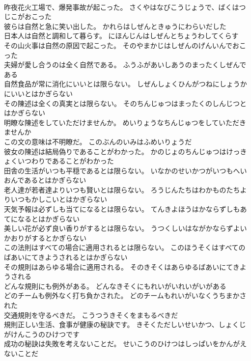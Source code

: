 \documentclass[8pt]{extreport}
\begin{document}
\begin{CJK}{UTF8}{min}
\\	昨夜花火工場で、爆発事故が起こった。	さくやはなびこうじょうで、ばくはつじこがおこった 
\\	彼らは自然と急に笑い出した。	かれらはしぜんときゅうにわらいだした 
\\	日本人は自然と調和して暮らす。	にほんじんはしぜんとちょうわしてくらす 
\\	その山火事は自然の原因で起こった。	そのやまかじはしぜんのげんいんでおこった 
\\	夫婦が愛し合うのは全く自然である。	ふうふがあいしあうのまったくしぜんである 
\\	自然食品が常に消化にいいとは限らない。	しぜんしょくひんがつねにしょうかにいいとはかぎらない 
\\	その陳述は全くの真実とは限らない。	そのちんじゅつはまったくのしんじつとはかぎらない 
\\	明瞭な陳述をしていただけませんか。	めいりょうなちんじゅつをしていただきませんか 
\\	この文の意味は不明瞭だ。	このぶんのいみはふめいりょうだ 
\\	彼女の陳述は結局偽りであることがわかった。	かのじょのちんじゅつはけっきょくいつわりであることがわかった 
\\	田舎の生活がいつも平穏であるとは限らない。	いなかのせいかつがいつもへいおんであるとはかぎらない 
\\	老人達が若者達よりいつも賢いとは限らない。	ろうじんたちはわかものたちよりいつもかしこいとはかぎらない 
\\	天気予報は必ずしも当てになるとは限らない。	てんきよほうはかならずしもあてになるとはかぎらない 
\\	美しい花が必ず良い香りがするとは限らない。	うつくしいはながかならずよいかおりがするとかぎらない 
\\	この法則はすべての場合に適用されるとは限らない。	このほうそくはすべてのばあいにてきようされるとはかぎらない 
\\	その規則はあらゆる場合に適用される。	そのきそくはあらゆるばあいにてきようされる 
\\	どんな規則にも例外がある。	どんなきそくにもれいがいれいがいがある 
\\	どのチームも例外なく打ち負かされた。	どのチームもれいがいなくうちまかされた 
\\	交通規則を守るべきだ。	こうつうきそくをまもるべきだ 
\\	規則正しい生活、食事が健康の秘訣です。	きそくただしいせいかつ、しょくじがけんこうのひけつです 
\\	成功の秘訣は失敗を考えないことだ。	せいこうのひけつはしっぱいをかんがえないことだ 

\end{CJK}
\end{document}
